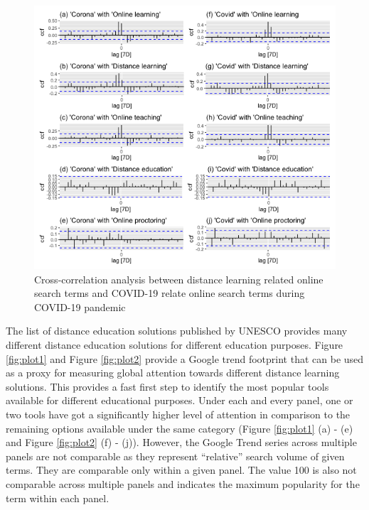 \documentclass[11pt,a4paper,]{article}
\begin{document}
\begin{figure}[h]

{\centering \includegraphics[width=1\textwidth]{figure/ccfAnalysis-1} 

}

\caption{Cross-correlation analysis between distance learning related online search terms and COVID-19 relate online search terms during COVID-19 pandemic}\label{fig:ccfAnalysis}
\end{figure}

The list of distance education solutions published by UNESCO provides many different distance education solutions for different education purposes. Figure \ref{fig:plot1} and Figure \ref{fig:plot2} provide a Google trend footprint that can be used as a proxy for measuring global attention towards different distance learning solutions. This provides a fast first step to identify the most popular tools available for different educational purposes. Under each and every panel, one or two tools have got a significantly higher level of attention in comparison to the remaining options available under the same category (Figure \ref{fig:plot1} (a) - (e) and Figure \ref{fig:plot2} (f) - (j)). However, the Google Trend series across multiple panels are not comparable as they represent ``relative'' search volume of given terms. They are comparable only within a given panel. The value 100 is also not comparable across multiple panels and indicates the maximum popularity for the term within each panel.
\end{document}
